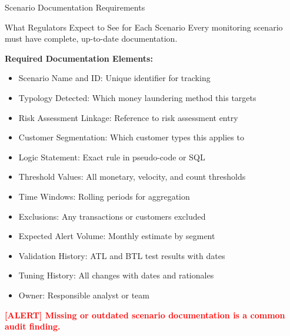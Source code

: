 \documentclass[11pt,a4paper]{beamer}
\newcommand{\redflag}[1]{\textcolor{red}{\textbf{[ALERT] #1}}}
\begin{document}
	\begin{frame}{Scenario Documentation Requirements}
	\begin{block}{What Regulators Expect to See for Each Scenario}
		Every monitoring scenario must have complete, up-to-date documentation.
	\end{block}
	
	\textbf{Required Documentation Elements:}
	\begin{itemize}
		\item Scenario Name and ID: Unique identifier for tracking
		\item Typology Detected: Which money laundering method this targets
		\item Risk Assessment Linkage: Reference to risk assessment entry
		\item Customer Segmentation: Which customer types this applies to
		\item Logic Statement: Exact rule in pseudo-code or SQL
		\item Threshold Values: All monetary, velocity, and count thresholds
		\item Time Windows: Rolling periods for aggregation
		\item Exclusions: Any transactions or customers excluded
		\item Expected Alert Volume: Monthly estimate by segment
		\item Validation History: ATL and BTL test results with dates
		\item Tuning History: All changes with dates and rationales
		\item Owner: Responsible analyst or team
	\end{itemize}
	
	\redflag{Missing or outdated scenario documentation is a common audit finding.}
	\end{frame}
	
\end{document}
